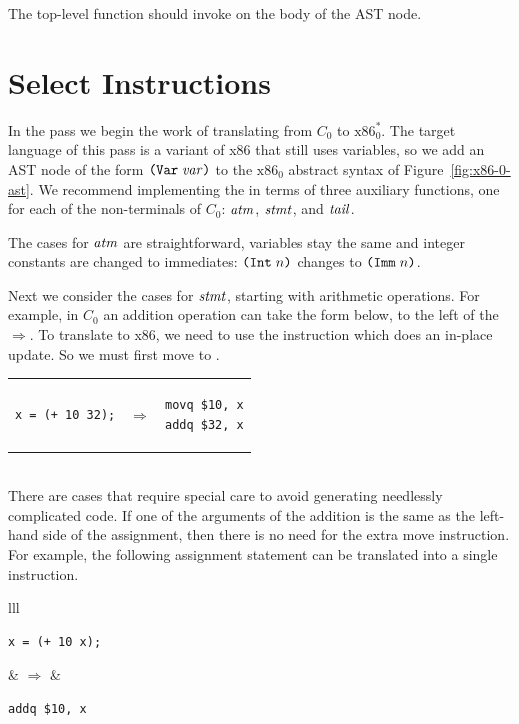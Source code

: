 \documentclass[11pt]{book}
\begin{document}
The top-level  function should invoke
 on the body of the  AST node.

\section{Select Instructions}
\label{sec:select-r1}

In the  pass we begin the work of
translating from $C_0$ to $\text{x86}^{*}_0$. The target language of
this pass is a variant of x86 that still uses variables, so we add an
AST node of the form $\texttt{(Var}\;\mathit{var}\texttt{)}$ to the $\text{x86}_0$ abstract
syntax of Figure~\ref{fig:x86-0-ast}.  We recommend implementing the
 in terms of three auxiliary functions, one
for each of the non-terminals of $C_0$: $\mathit{atm}$, $\mathit{stmt}$, and $\mathit{tail}$.

The cases for $\mathit{atm}$ are straightforward, variables stay
the same and integer constants are changed to immediates:
$\texttt{(Int}\;n\texttt{)}$ changes to $\texttt{(Imm}\;n\texttt{)}$.

Next we consider the cases for $\mathit{stmt}$, starting with arithmetic
operations. For example, in $C_0$ an addition operation can take the
form below, to the left of the $\Rightarrow$.  To translate to x86, we
need to use the  instruction which does an in-place
update. So we must first move  to . \\
\begin{tabular}{lll}
\begin{minipage}{0.4\textwidth}
\begin{lstlisting}
x = (+ 10 32);
\end{lstlisting}
\end{minipage}
&
$\Rightarrow$
&
\begin{minipage}{0.4\textwidth}
\begin{lstlisting}
movq $10, x
addq $32, x
\end{lstlisting}
\end{minipage}
\end{tabular} \\
%
There are cases that require special care to avoid generating
needlessly complicated code. If one of the arguments of the addition
is the same as the left-hand side of the assignment, then there is no
need for the extra move instruction.  For example, the following
assignment statement can be translated into a single 
instruction.\\
\begin{tabular}{lll}
\begin{minipage}{0.4\textwidth}
\begin{lstlisting}
x = (+ 10 x);
\end{lstlisting}
\end{minipage}
&
$\Rightarrow$
&
\begin{minipage}{0.4\textwidth}
\begin{lstlisting}
addq $10, x
\end{lstlisting}
\end{minipage}
\end{tabular} \\
\end{document}
